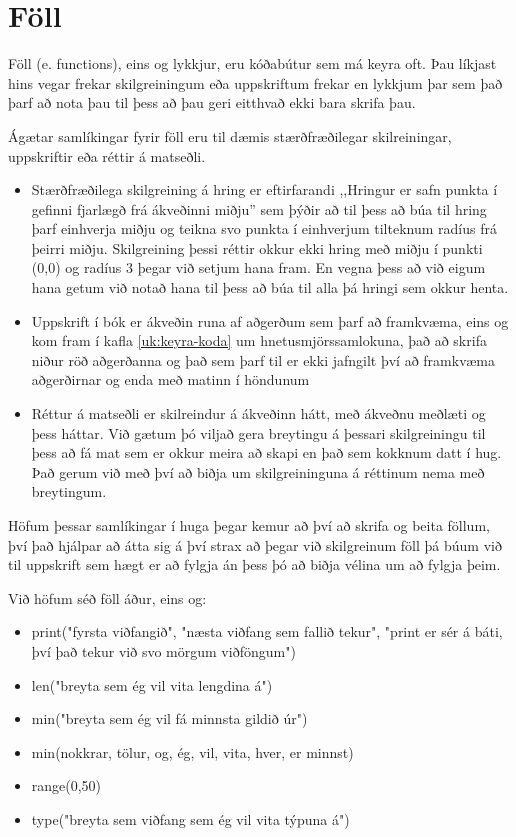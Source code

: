
\chapter{Föll}\label{k:föll}
Föll (e. functions), eins og lykkjur, eru kóðabútur sem má keyra oft.
Þau líkjast hins vegar frekar skilgreiningum eða uppskriftum frekar en lykkjum þar sem það þarf að nota þau til þess að þau geri eitthvað ekki bara skrifa þau.

Ágætar samlíkingar fyrir föll eru til dæmis stærðfræðilegar skilreiningar, uppskriftir eða réttir á matseðli.

\begin{itemize}
	\item Stærðfræðilega skilgreining á hring er eftirfarandi ,,Hringur er safn punkta í gefinni fjarlægð frá ákveðinni miðju'' sem þýðir að til þess að búa til hring þarf einhverja miðju og teikna svo punkta í einhverjum tilteknum radíus frá þeirri miðju.
	Skilgreining þessi réttir okkur ekki hring með miðju í punkti (0,0) og radíus 3 þegar við setjum hana fram.
	En vegna þess að við eigum hana getum við notað hana til þess að búa til alla þá hringi sem okkur henta.
	\item Uppskrift í bók er ákveðin runa af aðgerðum sem þarf að framkvæma, eins og kom fram í kafla \ref{uk:keyra-koda} um hnetusmjörssamlokuna, það að skrifa niður röð aðgerðanna og það sem þarf til er ekki jafngilt því að framkvæma aðgerðirnar og enda með matinn í höndunum
	\item Réttur á matseðli er skilreindur á ákveðinn hátt, með ákveðnu meðlæti og þess háttar.
	Við gætum þó viljað gera breytingu á þessari skilgreiningu til þess að fá mat sem er okkur meira að skapi en það sem kokknum datt í hug.
	Það gerum við með því að biðja um skilgreininguna á réttinum nema með breytingum.
\end{itemize}

Höfum þessar samlíkingar í huga þegar kemur að því að skrifa og beita föllum, því það hjálpar að átta sig á því strax að þegar við skilgreinum föll þá búum við til uppskrift sem hægt er að fylgja án þess þó að biðja vélina um að fylgja þeim.

Við höfum séð föll áður, eins og: 

\begin{itemize}
	\item print("fyrsta viðfangið", "næsta viðfang sem fallið tekur", "print er sér á báti, því það tekur við svo mörgum viðföngum")
	\item len("breyta sem ég vil vita lengdina á")
	\item min("breyta sem ég vil fá minnsta gildið úr")
	\item min(nokkrar, tölur, og, ég, vil, vita, hver, er minnst)
	\item range(0,50)
	\item type("breyta sem viðfang sem ég vil vita týpuna á")
\end{itemize}


